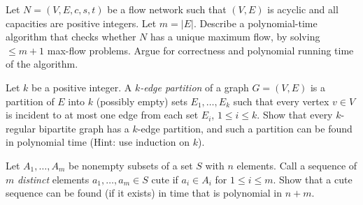 \documentclass{article}
\begin{document}
\begin{exercise}
    Let $N=(V,E,c,s,t)$ be a flow network such that $(V,E)$ is acyclic and all capacities are positive integers. Let $m= |E|$. Describe a polynomial-time algorithm that checks whether $N$ has a unique maximum flow, by solving $\leq m+1$ max-flow problems. Argue for correctness and polynomial running time of the algorithm.
\end{exercise}

\begin{exercise}
    Let $k$ be a positive integer. A \textit{$k$-edge partition} of a graph $G =(V,E)$ is a partition of $E$ into $k$ (possibly empty) sets $E_1,\dots, E_k$ such that every vertex $v\in V$ is incident to at most one edge from each set $E_i$, $1\leq i\leq k$. Show that every $k$-regular bipartite graph has a $k$-edge partition, and such a partition can be found in polynomial time (Hint: use induction on $k$).
\end{exercise}

\begin{exercise}
    Let $A_1,\dots, A_m$ be nonempty subsets of a set $S$ with $n$ elements. Call a sequence of $m$ \textit{distinct} elements $a_1,\dots, a_m\in S$ cute if $a_i\in A_i$ for $1\leq i\leq m$. Show that a cute sequence can be found (if it exists) in time that is polynomial in $n+m$.
\end{exercise}
\end{document}
